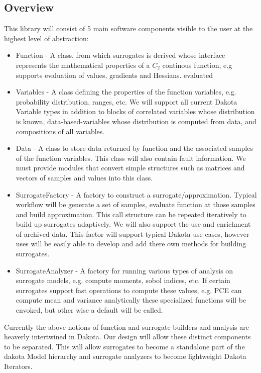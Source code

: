 \documentclass[dakotalogo]{dakota-article}
\newcommand{\myitem}{\item[\color{darkblue}\ding{228}]}
\begin{document}
\subsection{Overview}
This library will consist of 5 main software components visible to the user at the highest level of abstraction:
\begin{itemize}
\myitem Function - A class, from which surrogates is derived whose interface represents the mathematical properties of a $C_2$ continous function, e.g supports evaluation of values, gradients and Hessians. evaluated 
\myitem Variables - A class defining the properties of the function variables, e.g. probability distribution, ranges, etc. We will support all current Dakota Variable types in addition to blocks of correlated variables whose distribution is known, data-based-variables whose distribution is computed from data, and compositions of all variables.
\myitem Data - A class to store data returned by function and the associated samples of the function variables. This class will also contain fault information. We must provide modules that convert simple structures such as matrices and vectors of samples and values into this class. 
\myitem SurrogateFactory - A factory to construct a surrogate/approximation. Typical workflow will be generate a set of samples, evaluate function at those samples and build approximation. This call structure can be repeated iteratively to build up surrogates adaptively. We will also support the use and enrichment of archived data. This factor will support typical Dakota use-cases, however uses will be easily able to develop and add there own methods for building surrogates. 
\myitem SurrogateAnalyzer - A factory for running various types of analysis on surrogate models, e.g. compute moments, sobol indices, etc. If certain surrogates support fast operations to compute these values, e.g. PCE can compute mean and variance analytically these specialized functions will be envoked, but other wise a default will be called.
\end{itemize}
Currently the above notions of function and surrogate builders and analysis are heaverly intertwined in Dakota. Our design will allow these distinct components to be separated. This will allow surrogates to become a standalone part of the dakota Model hierarchy and surrogate analyzers to become lightweight Dakota Iterators.
\end{document}
